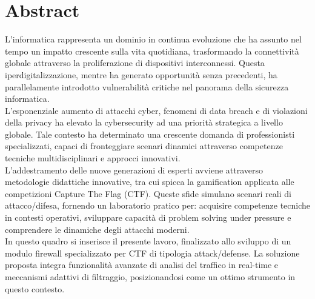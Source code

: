\chapter*{Abstract}

L'informatica rappresenta un dominio in continua evoluzione che ha assunto nel tempo un impatto crescente sulla vita quotidiana, trasformando la connettività globale attraverso la proliferazione di dispositivi interconnessi. Questa iperdigitalizzazione, mentre ha generato opportunità senza precedenti, ha parallelamente introdotto vulnerabilità critiche nel panorama della sicurezza informatica.\\
L'esponenziale aumento di attacchi cyber, fenomeni di data breach e di violazioni della privacy ha elevato la cybersecurity ad una priorità strategica a livello globale. Tale contesto ha determinato una crescente domanda di professionisti specializzati, capaci di fronteggiare scenari dinamici attraverso competenze tecniche multidisciplinari e approcci innovativi.\\
L'addestramento delle nuove generazioni di esperti avviene attraverso metodologie didattiche innovative, tra cui spicca la gamification applicata alle competizioni Capture The Flag (CTF). Queste sfide simulano scenari reali di attacco/difesa, fornendo un laboratorio pratico per: acquisire competenze tecniche in contesti operativi, sviluppare capacità di problem solving under pressure e comprendere le dinamiche degli attacchi moderni.\\
In questo quadro si inserisce il presente lavoro, finalizzato allo sviluppo di un modulo firewall specializzato per CTF di tipologia attack/defense. La soluzione proposta integra funzionalità avanzate di analisi del traffico in real-time e meccanismi adattivi di filtraggio, posizionandosi come un ottimo strumento in questo contesto.

